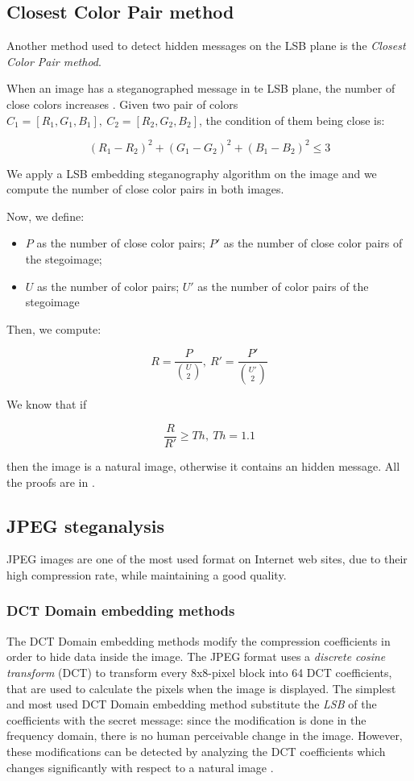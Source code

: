 \documentclass[../../main.tex]{subfiles}
\begin{document}
\subsection{Closest Color Pair method}
Another method used to detect hidden messages on the LSB plane is the
\emph{Closest Color Pair method}.

When an image has a steganographed message in te LSB plane, the number of
close colors increases \cite{detecting-lsb-steganography}. Given two pair of
colors $C_1=[R_1,G_1,B_1],\ C_2=[R_2,G_2,B_2]$, the condition of them being
close is:

\[ (R_1-R_2)^2+(G_1-G_2)^2+(B_1-B_2)^2 \leq 3 \]

We apply a LSB embedding steganography algorithm on the image and we compute
the number of close color pairs in both images.

Now, we define:

\begin{itemize}[noitemsep]
    \item $P$ as the number of close color pairs; $P'$ as the number of
          close color pairs of the stegoimage;
    \item $U$ as the number of color pairs; $U'$ as the number of color
          pairs of the stegoimage
\end{itemize}

Then, we compute:

\[ R = \frac{P}{\binom{U}{2}},\ R' = \frac{P'}{\binom{U'}{2}} \]

We know that if

\[ \frac{R}{R'} \geq Th,\ Th = 1.1 \]

\noindent then the image is a natural image, otherwise it contains an hidden
message. All the proofs are in \cite{detecting-lsb-steganography}.

\subsection{JPEG steganalysis}
JPEG images are one of the most used format on Internet web sites, due to
their high compression rate, while maintaining a good quality.
\subsubsection{DCT Domain embedding methods}
The DCT Domain embedding methods modify the compression coefficients
in order to hide data inside the image.
The JPEG format uses a \emph{discrete cosine transform} (DCT) to transform
every 8x8-pixel block into 64 DCT coefficients, that are used to calculate
the pixels when the image is displayed.
The simplest and most used DCT Domain embedding method substitute the
\emph{LSB} of the coefficients with the secret message: since the
modification is done in the frequency domain, there is no human perceivable
change in the image.
However, these modifications can be detected by analyzing the DCT coefficients
which changes significantly with respect to a natural image
\cite{jpeg-image-internet}.
\end{document}
